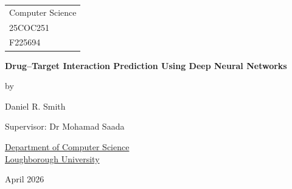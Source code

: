 \documentclass[a4paper]{report}
\begin{document}


\thispagestyle{empty}

\fancypage{}{}

\begin{center}

\Large{
\hfill \begin{tabular}{l}

Computer Science \\
25COC251 \\ 
F225694

\end{tabular}
}



\vspace*{\fill}

\Large{\textbf{Drug–Target Interaction Prediction Using Deep Neural Networks}}

\vspace*{\fill}

by

\vspace*{\fill}

Daniel R. Smith


\vspace*{\fill}
Supervisor: Dr Mohamad Saada
\vspace*{\fill}

\underline{Department of Computer Science} \\
\underline{Loughborough University}

\vspace*{\fill}
April 2026

\end{center}


\tableofcontents
\newpage

 









\renewcommand\bibname{References}

\end{document}
